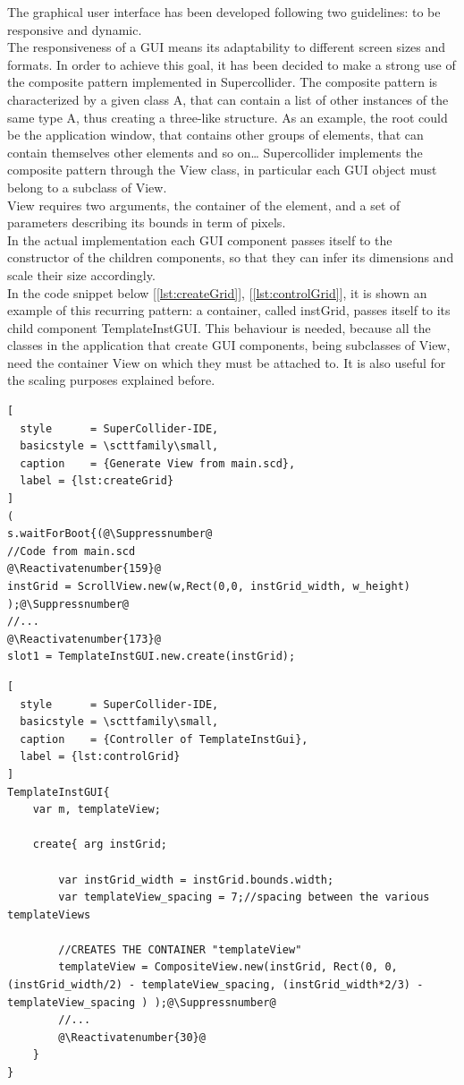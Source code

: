 \documentclass[main.tex]{subfiles}
\begin{document}
The graphical user interface has been developed following two guidelines: to be responsive and dynamic.\\
The responsiveness of a GUI means its adaptability to different screen sizes and formats. In order to achieve this goal, it has been decided to make a strong use of the composite pattern implemented in Supercollider.
The composite pattern is characterized by a given class A, that can contain a list of other instances of the same type A, thus creating a three-like structure. As an example, the root could be the application window, that contains other groups of elements, that can contain themselves other elements and so on…
Supercollider implements the composite pattern through the View class, in particular each GUI object must belong to a subclass of View.\\
\newpage
View requires two arguments, the container of the element, and a set of parameters describing its bounds in term of pixels.\\
In the actual implementation each GUI component passes itself to the constructor of the children components, so that they can infer its dimensions and scale their size accordingly.\\
In the code snippet below [\autoref{lst:createGrid}], [\autoref{lst:controlGrid}], it is shown an example of this recurring pattern: a container, called instGrid, passes itself to its child component TemplateInstGUI. This behaviour is needed, because all the classes in the application that create GUI components, being subclasses of View, need the container View on which they must be attached to. It is also useful for the scaling purposes explained before.\\
[2mm]
\begin{lstlisting}[
  style      = SuperCollider-IDE,
  basicstyle = \scttfamily\small,
  caption    = {Generate View from main.scd},
  label = {lst:createGrid}
]
(
s.waitForBoot{(@\Suppressnumber@
//Code from main.scd
@\Reactivatenumber{159}@
instGrid = ScrollView.new(w,Rect(0,0, instGrid_width, w_height) );@\Suppressnumber@
//...
@\Reactivatenumber{173}@
slot1 = TemplateInstGUI.new.create(instGrid);
\end{lstlisting}

\begin{lstlisting}[
  style      = SuperCollider-IDE,
  basicstyle = \scttfamily\small,
  caption    = {Controller of TemplateInstGui},
  label = {lst:controlGrid}
]
TemplateInstGUI{
	var m, templateView;
	
	create{ arg instGrid;
		
		var instGrid_width = instGrid.bounds.width;
		var templateView_spacing = 7;//spacing between the various templateViews
		
		//CREATES THE CONTAINER "templateView"
		templateView = CompositeView.new(instGrid, Rect(0, 0, (instGrid_width/2) - templateView_spacing, (instGrid_width*2/3) - templateView_spacing ) );@\Suppressnumber@
		//...
		@\Reactivatenumber{30}@
	}
}
\end{lstlisting}
\end{document}
